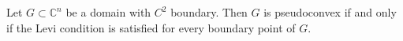 Let $G \subset \mathbb{C}^n$ be a domain with $C^2$ boundary. Then $G$ is pseudoconvex if and only if the Levi condition is satisfied for every boundary point of $G$.
